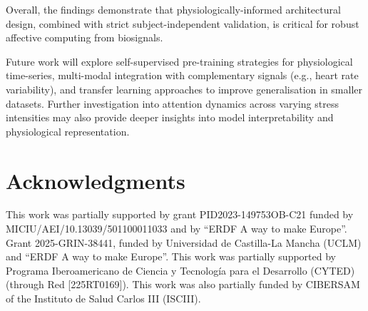 \documentclass[runningheads]{llncs}
\begin{document}
Overall, the findings demonstrate that physiologically-informed architectural design, combined with strict subject-independent validation, is critical for robust affective computing from biosignals.

Future work will explore self-supervised pre-training strategies for physiological time-series, multi-modal integration with complementary signals (e.g., heart rate variability), and transfer learning approaches to improve generalisation in smaller datasets. Further investigation into attention dynamics across varying stress intensities may also provide deeper insights into model interpretability and physiological representation.

\section*{Acknowledgments} 

This work was partially supported by grant PID2023-149753OB-C21 funded by MICIU/AEI/10.13039/501100011033 and by ``ERDF A way to make Europe''. Grant 2025-GRIN-38441, funded by Universidad de Castilla-La Mancha (UCLM) and ``ERDF A way to make Europe''. This work was partially supported by Programa Iberoamericano de Ciencia y Tecnología para el Desarrollo (CYTED) (through Red [225RT0169]). This work was also partially funded by CIBERSAM of the Instituto de Salud Carlos III (ISCIII).

%
%


%
\end{document}

